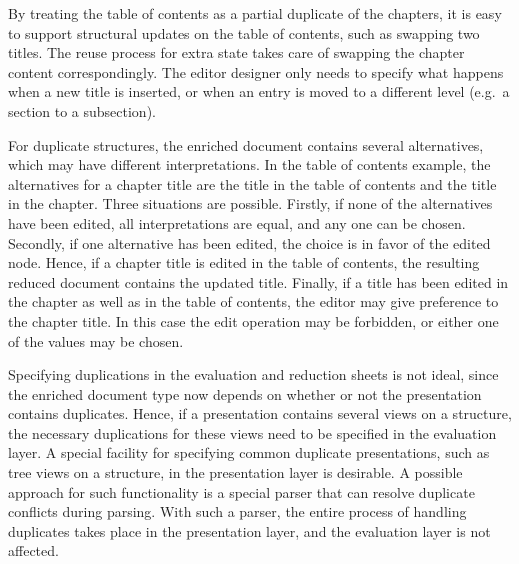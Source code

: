 By treating the table of contents as a partial duplicate of the chapters, it is easy to support structural updates on the table of contents, such as swapping two titles. The reuse process for extra state takes care of swapping the chapter content correspondingly. The editor designer only needs to specify what happens when a new title is inserted, or when an entry is moved to a different level (e.g.\ a section to a subsection).


\bc
For duplicate structures, the enriched document contains several alternatives, which may have different interpretations. In the table of contents example, the alternatives for a chapter title are the title in the table of contents and the title in the chapter. Three situations are possible. Firstly, if none of the alternatives have been edited, all interpretations are equal, and any one can be chosen. Secondly, if one alternative has been edited, the choice is in favor of the edited node. Hence, if a chapter title is edited in the table of contents, the resulting reduced document contains the updated title. Finally, if a title has been edited in the chapter as well as in the table of contents, the editor may give preference to the chapter title. In this case the edit operation may be forbidden, or either one of the values may be chosen.
\ec

\bc
Specifying duplications in the evaluation and reduction sheets is not ideal, since the enriched document type now depends on whether or not the presentation contains duplicates. Hence, if a presentation contains several views on a structure, the necessary duplications for these views need to be specified in the evaluation layer. A special facility for specifying common duplicate presentations, such as tree views on a structure, in the presentation layer is desirable. A possible approach for such functionality is a special parser that can resolve duplicate conflicts during parsing. With such a parser, the entire process of handling duplicates takes place in the presentation layer, and the evaluation layer is not affected. 
\ec




